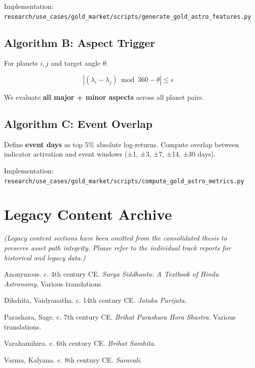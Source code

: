 \documentclass[
  11pt,
  a4paper,
  oneside,
  openany]{report}
\newlength{\cslhangindent}
\newenvironment{CSLReferences}[2] %
 {\begin{list}{}{%
  \setlength{\itemindent}{0pt}
  \setlength{\leftmargin}{0pt}
  \setlength{\parsep}{0pt}
  \ifodd #1
   \setlength{\leftmargin}{\cslhangindent}
   \setlength{\itemindent}{-1\cslhangindent}
  \fi
  \setlength{\itemsep}{#2\baselineskip}}}
 {\end{list}}
\begin{document}
Implementation:
\texttt{research/use\_cases/gold\_market/scripts/generate\_gold\_astro\_features.py}

\section{Algorithm B: Aspect Trigger}\label{algorithm-b-aspect-trigger}

For planets \(i,j\) and target angle \(\theta\):

\[
|(\lambda_i - \lambda_j) \bmod 360 - \theta| \leq \epsilon
\]

We evaluate \textbf{all major + minor aspects} across all planet pairs.

\section{Algorithm C: Event Overlap}\label{algorithm-c-event-overlap}

Define \textbf{event days} as top 5\% absolute log-returns. Compute
overlap between indicator activation and event windows (±1, ±3, ±7, ±14,
±30 days).

Implementation:
\texttt{research/use\_cases/gold\_market/scripts/compute\_gold\_astro\_metrics.py}

\chapter{Legacy Content Archive}\label{legacy-content-archive}

\emph{(Legacy content sections have been omitted from the consolidated
thesis to preserve asset path integrity. Please refer to the individual
track reports for historical and legacy data.)}

\label{refs}
\begin{CSLReferences}{1}{0}
Anonymous. c. 4th century CE. \emph{Surya Siddhanta: A Textbook of Hindu
Astronomy}. Various translations.

Dikshita, Vaidyanatha. c. 14th century CE. \emph{Jataka Parijata}.

Parashara, Sage. c. 7th century CE. \emph{Brihat Parashara Hora
Shastra}. Various translations.

Varahamihira. c. 6th century CE. \emph{Brihat Samhita}.

Varma, Kalyana. c. 8th century CE. \emph{Saravali}.

\end{CSLReferences}
\end{document}

